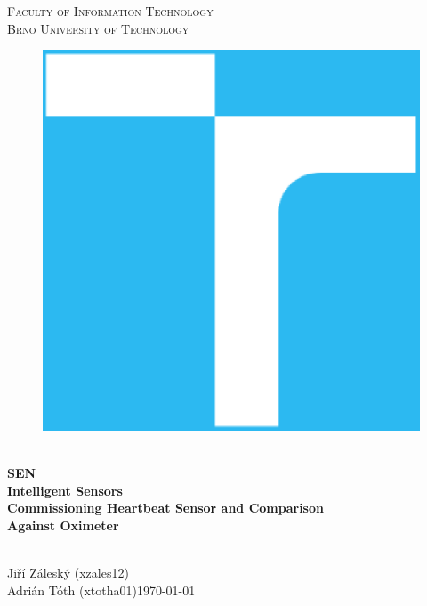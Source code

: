 \documentclass[11pt,a4paper]{article}
\begin{document}


\begin{titlepage}
    \begin{center}
        \Huge
        \textsc{
            Faculty of Information Technology\\
            Brno University of Technology
        }
        \vspace{80px}
        \begin{figure}[!h]
            \centering
            \includegraphics[scale=0.3]{img/vutbr-fit-logo.eps}
        \end{figure}
        \\[15mm]
        \Huge{
            \textbf{
                SEN
            }
        }
        \\[1.5mm]
        \huge{
            \textbf{
                Intelligent Sensors
            }
        }
        \\[2.5em]
        \LARGE{
            \textbf{
                Commissioning Heartbeat Sensor and Comparison\\
                Against Oximeter
            }
        }
        \vfill
    \end{center}
        \Large{
            \hfill\\
            Jiří Záleský (xzales12)\\
            Adrián Tóth (xtotha01)\hfill \today
        }

\end{titlepage}
\end{document}
